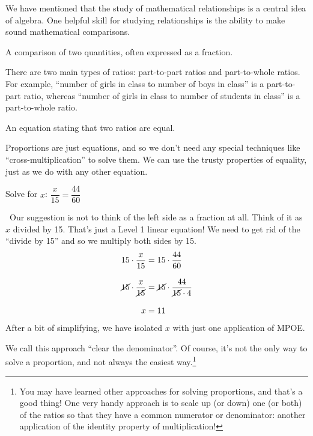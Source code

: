 
We have mentioned that the study of mathematical relationships is a central idea of algebra. One helpful skill for studying relationships is the ability to make sound mathematical comparisons.

\begin{boxdef}[Ratio]
A comparison of two quantities, often expressed as a fraction.
\end{boxdef}

There are two main types of ratios: part-to-part ratios and part-to-whole ratios. For example, ``number of girls in class to number of boys in class'' is a part-to-part ratio, whereas ``number of girls in class to number of students in class'' is a part-to-whole ratio.

\begin{boxdef}[Proportion]
An equation stating that two ratios are equal.
\end{boxdef}

Proportions are just equations, and so we don't need any special techniques like ``cross-multiplication'' to solve them. We can use the trusty properties of equality, just as we do with any other equation.

\begin{boxex}
Solve for $x$: $\dfrac{x}{15}=\dfrac{44}{60}$

\exsoln\ Our suggestion is not to think of the left side as a fraction at all. Think of it as $x$ divided by 15. That's just a Level 1 linear equation! We need to get rid of the ``divide by 15'' and so we multiply both sides by 15.
\[\begin{aligned}
15\cdot\frac{x}{15} &= 15\cdot\frac{44}{60}\\[2ex]
\cancel{15}\cdot\frac{x}{\cancel{15}} &= \cancel{15}\cdot\frac{44}{\cancel{15}\cdot4}\\[2ex]
x&=11
\end{aligned}\]
After a bit of simplifying, we have isolated $x$ with just one application of MPOE.
\end{boxex}

We call this approach ``clear the denominator''. Of course, it's not the only way to solve a proportion, and not always the easiest way.\footnote{You may have learned other approaches for solving proportions, and that's a good thing! One very handy approach is to scale up (or down) one (or both) of the ratios so that they have a common numerator or denominator: another application of the identity property of multiplication!}

